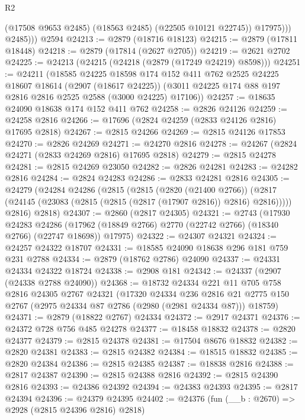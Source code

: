 \begin{lexlean}{R2}
\begin{coremodule}
                (@17508 @9653 @2485)
                (@18563 @2485)
                (@22505 @10121 @22745))
              @17975)))
          @2485)))
    @2594
@24213 := @2879 (@18716 @18123)
@24215 := @2879 (@17811 @18448)
@24218 := @2879 (@17814 (@2627 @2705))
@24219 := @2621 @2702
@24225 := @24213 (@24215 (@24218 (@2879 (@17249 @24219) @8598)))
@24251 := @24211
    (@18585
      @24225
      @18598
      @174
      @152
      @411
      @762
      @2525
      @24225
      @18607
      @18614
      (@2907 (@18617 @24225))
      (@3011 @24225 @174 @88 @197 @2816 @2816 @2525 @2588 (@3000 @24225) @17106))
@24257 := @18635 @24090 @18638 @174 @152 @411 @762
@24258 := @2826 @24126
@24259 := @24258 @2816
@24266 := @17696 (@2824 @24259 (@2833 @24126 @2816) @17695 @2818)
@24267 := @2815 @24266
@24269 := @2815 @24126 @17853
@24270 := @2826 @24269
@24271 := @24270 @2816
@24278 := @24267 (@2824 @24271 (@2833 @24269 @2816) @17695 @2818)
@24279 := @2815 @24278
@24281 := @2815 @24269 @23050
@24282 := @2826 @24281
@24283 := @24282 @2816
@24284 := @2824 @24283
@24286 := @2833 @24281 @2816
@24305 := @24279
    (@24284
      @24286
      (@2815
        (@2815
          (@2820 (@21400 @2766))
          (@2817 (@24145 (@23083 (@2815 (@2815 (@2817 (@17907 @2816)) @2816) @2816)))))
        @2816)
      @2818)
@24307 := @2860 (@2817 @24305)
@24321 := @2743
    (@17930
      @24283
      @24286
      (@17962 (@18849 @2766) @2770 (@22742 @2766) (@18340 @2766) (@22747 @18698))
      @17975)
@24322 := @24307 @24321
@24324 := @24257 @24322 @18707
@24331 := @18585 @24090 @18638 @296 @181 @759 @231 @2788
@24334 := @2879 (@18762 @2786) @24090
@24337 := @24331 @24334 @24322 @18724
@24338 := @2908 @181
@24342 := @24337 (@2907 (@24338 @2788 @24090))
@24368 := @18732
    @24334
    @221
    @11
    @705
    @758
    @2816
    @24305
    @2767
    @24321
    (@17320
      @24334
      @236
      @2816
      @21
      @2775
      @150
      @2767
      (@2975 @24334 @87 @2786 (@2980 (@2981 @24334 @87)))
      @18759)
@24371 := @2879 (@18822 @2767) @24334
@24372 := @2917 @24371
@24376 := @24372 @728 @756 @485 @24278
@24377 := @18458 @18832
@24378 := @2820 @24377
@24379 := @2815 @24378
@24381 := @17504 @8676 @18832
@24382 := @2820 @24381
@24383 := @2815 @24382
@24384 := @18515 @18832
@24385 := @2820 @24384
@24386 := @2815 @24385
@24387 := @18838 @2816
@24388 := @2817 @24387
@24390 := @2815 @24388 @2816
@24392 := @2815 @24390 @2816
@24393 := @24386 @24392
@24394 := @24383 @24393
@24395 := @2817 @24394
@24396 := @24379 @24395
@24402 := @24376 (fun (__b : @2670) => @2928 (@2815 @24396 @2816) @2818)

\end{coremodule}
\end{lexlean}
